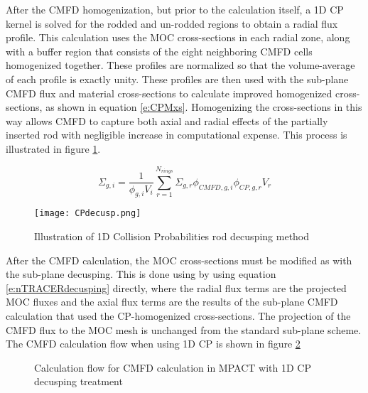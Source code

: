 After the CMFD homogenization, but prior to the calculation itself, a 1D CP kernel is solved for the rodded and un-rodded regions to obtain a radial flux profile.  This calculation uses the MOC cross-sections in each radial zone, along with a buffer region that consists of the eight neighboring CMFD cells homogenized together.  These profiles are normalized so that the volume-average of each profile is exactly unity.  These profiles are then used with the sub-plane CMFD flux and material cross-sections to calculate improved homogenized cross-sections, as shown in equation \ref{e:CPMxs}.  Homogenizing the cross-sections in this way allows CMFD to capture both axial and radial effects of the partially inserted rod with negligible increase in computational expense.  This process is illustrated in figure \ref{f:CPdecusp}.

\begin{equation}\label{e:CPMxs}
\Sigma_{g,i}=\frac{1}{\phi_{g,i}V_i}\sum_{r=1}^{N_{rings}} \Sigma_{g,r} \phi_{CMFD,g,i} \phi_{CP,g,r} V_r
\end{equation}

\begin{figure}
  \centering
  \texttt{[image: CPdecusp.png]}
  \caption[Collision Probabilities Decusping]{Illustration of 1D Collision Probabilities rod decusping method}\label{f:CPdecusp}
\end{figure}

After the CMFD calculation, the MOC cross-sections must be modified as with the sub-plane decusping.  This is done using by using equation \ref{e:nTRACERdecusping} directly, where the radial flux terms are the projected MOC fluxes and the axial flux terms are the results of the sub-plane CMFD calculation that used the CP-homogenized cross-sections.  The projection of the CMFD flux to the MOC mesh is unchanged from the standard sub-plane scheme.  The CMFD calculation flow when using 1D CP is shown in figure \ref{f:1dcpm-flowchart}

\begin{figure}
  \centering
  
  \caption[Stuff]{Calculation flow for CMFD calculation in MPACT with 1D CP decusping treatment}\label{f:1dcpm-flowchart}
\end{figure}